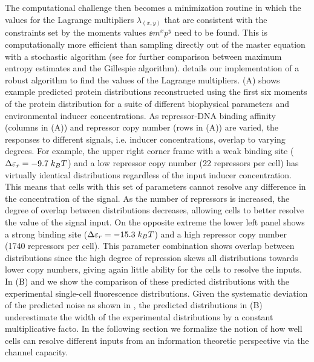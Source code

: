 The computational challenge then becomes a minimization routine in which the
values for the Lagrange multipliers $\lambda_{(x,y)}$ that are consistent with
the constraints set by the moments values $\ee{m^x p^y}$ need to be found. This
is computationally more efficient than sampling directly out of the master
equation with a stochastic algorithm (see  for further
comparison between maximum entropy estimates and the Gillespie algorithm).
 details our implementation of a robust algorithm to find
the values of the Lagrange multipliers. (A) shows example
predicted protein distributions reconstructed using the first six moments of
the protein distribution for a suite of different biophysical parameters and
environmental inducer concentrations. As repressor-DNA binding affinity
(columns in (A)) and repressor copy number (rows in
(A)) are varied, the responses to different signals, i.e.
inducer concentrations, overlap to varying degrees. For example, the upper
right corner frame with a weak binding site ($\Delta\varepsilon_r = -9.7 \; k_BT$) and a low
repressor copy number (22 repressors per cell) has virtually identical
distributions regardless of the input inducer concentration. This means that
cells with this set of parameters cannot resolve any difference in the
concentration of the signal. As the number of repressors is increased, the
degree of overlap between distributions decreases, allowing cells to better
resolve the value of the signal input. On the opposite extreme the lower left
panel shows a strong binding site ($\Delta\varepsilon_r = -15.3 \; k_BT$) and a high repressor
copy number (1740 repressors per cell). This parameter combination shows
overlap between distributions since the high degree of repression skews all
distributions towards lower copy numbers, giving again little ability for the
cells to resolve the inputs. In (B) and 
we show the comparison of these predicted distributions with the experimental
single-cell fluorescence distributions. Given the systematic deviation of the
predicted noise as shown in , the predicted distributions
in (B) underestimate the width of the experimental
distributions by a constant multiplicative facto. In the following section we
formalize the notion of how well cells can resolve different inputs from an
information theoretic perspective via the channel capacity.

